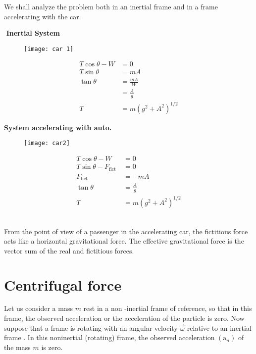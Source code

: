 \begin{answer}
	We shall analyze the problem both in an inertial frame and in a frame accelerating with the car.\\
	\begin{minipage}{0.45\textwidth}
		$\left. \right. $\\
	$\left. \right. $ \hspace{2cm}\textbf{Inertial System}
\begin{figure}[H]
	\centering
	\texttt{[image: car 1]}
\end{figure}
	\begin{align*}
	T \cos \theta-W &=0 \\
	T \sin \theta &=m A \\
	\tan \theta &=\frac{m A}{W}\\&=\frac{A}{g} \\
	T &=m\left(g^{2}+A^{2}\right)^{1 / 2}
	\end{align*}
	\end{minipage} \hfill
\begin{minipage}{0.45\textwidth}
		$\left. \right. $\\
\textbf{System accelerating with auto.}
\begin{figure}[H]
	\centering
	\texttt{[image: car2]}
\end{figure}
	\begin{align*}
	T \cos \theta-W &=0 \\
	T \sin \theta-F_{\text {fict }} &=0 \\
	F_{\text {fict }} &=-m A \\
	\tan \theta &=\frac{A}{g} \\
	T &=m\left(g^{2}+A^{2}\right)^{1 / 2}
	\end{align*}
\end{minipage}\\
From the point of view of a passenger in the accelerating car, the fictitious force acts like a horizontal gravitational force. The effective gravitational force is the vector sum of the real and fictitious forces.
\end{answer}
\section{Centrifugal force}
Let us consider a mass $m$ rest in  a non -inertial frame of reference, so that in this frame, the observed acceleration or the acceleration of the particle is zero. Now suppose that a frame is rotating with an angular velocity $\vec{\omega}$ relative to an inertial frame . In this noninertial (rotating) frame, the observed acceleration $\left(\mathrm{a}_{n}\right)$ of the mass $m$ is zero.\\

